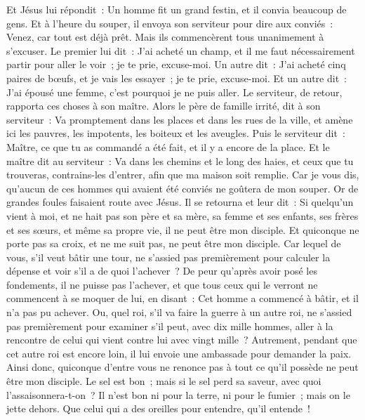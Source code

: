 \begin{multicols}{2}
Et Jésus lui répondit~: Un homme fit un grand festin, et il convia beaucoup de gens.
Et à l'heure du souper, il envoya son serviteur pour dire aux conviés~: Venez, car tout est déjà prêt.
Mais ils commencèrent tous unanimement à s'excuser. Le premier lui dit~: J'ai acheté un champ, et il me faut nécessairement partir pour aller le voir~; je te prie, excuse-moi.
Un autre dit~: J'ai acheté cinq paires de bœufs, et je vais les essayer~; je te prie, excuse-moi.
Et un autre dit~: J'ai épousé une femme, c'est pourquoi je ne puis aller.
Le serviteur, de retour, rapporta ces choses à son maître. Alors le père de famille irrité, dit à son serviteur~: Va promptement dans les places et dans les rues de la ville, et amène ici les pauvres, les impotents, les boiteux et les aveugles.
Puis le serviteur dit~: Maître, ce que tu as commandé a été fait, et il y a encore de la place.
Et le maître dit au serviteur~: Va dans les chemins et le long des haies, et ceux que tu trouveras, contrains-les d'entrer, afin que ma maison soit remplie.
Car je vous dis, qu'aucun de ces hommes qui avaient été conviés ne goûtera de mon souper.
Or de grandes foules faisaient route avec Jésus. Il se retourna et leur dit~:
Si quelqu'un vient à moi, et ne hait pas son père et sa mère, sa femme et ses enfants, ses frères et ses sœurs, et même sa propre vie, il ne peut être mon disciple.
Et quiconque ne porte pas sa croix, et ne me suit pas, ne peut être mon disciple.
Car lequel de vous, s'il veut bâtir une tour, ne s'assied pas premièrement pour calculer la dépense et voir s'il a de quoi l'achever~?
De peur qu'après avoir posé les fondements, il ne puisse pas l'achever, et que tous ceux qui le verront ne commencent à se moquer de lui,
en disant~: Cet homme a commencé à bâtir, et il n'a pas pu achever.
Ou, quel roi, s'il va faire la guerre à un autre roi, ne s'assied pas premièrement pour examiner s'il peut, avec dix mille hommes, aller à la rencontre de celui qui vient contre lui avec vingt mille~?
Autrement, pendant que cet autre roi est encore loin, il lui envoie une ambassade pour demander la paix.
Ainsi donc, quiconque d'entre vous ne renonce pas à tout ce qu'il possède ne peut être mon disciple.
Le sel est bon~; mais si le sel perd sa saveur, avec quoi l'assaisonnera-t-on~?
Il n'est bon ni pour la terre, ni pour le fumier~; mais on le jette dehors. Que celui qui a des oreilles pour entendre, qu'il entende~!

\end{multicols}
